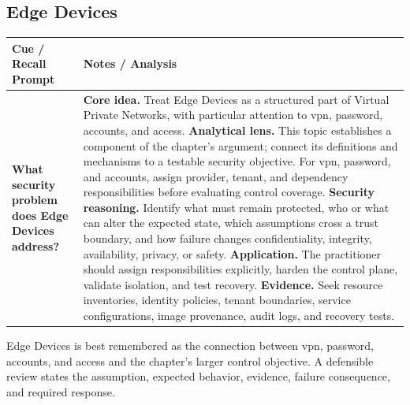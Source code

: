 \documentclass[11pt]{article}
\newcommand{\CornellHeader}{%
\rowcolor{Navy}\color{white}\bfseries Cue / Recall Prompt & \color{white}\bfseries Notes / Analysis\\\hline}
\newcommand{\CornellRow}[2]{%
\cellcolor{CueGray}\RaggedRight\textbf{#1} & \RaggedRight #2\\\hline}
\begin{document}
\subsection*{Edge Devices}
\begin{longtable}{>{\RaggedRight\arraybackslash}p{}|>{\RaggedRight\arraybackslash}p{}}
\CornellHeader
\CornellRow{What security problem does Edge Devices address?}{\textbf{Core idea.} Treat Edge Devices as a structured part of Virtual Private Networks, with particular attention to vpn, password, accounts, and access. \textbf{Analytical lens.} This topic establishes a component of the chapter's argument; connect its definitions and mechanisms to a testable security objective. For vpn, password, and accounts, assign provider, tenant, and dependency responsibilities before evaluating control coverage. \textbf{Security reasoning.} Identify what must remain protected, who or what can alter the expected state, which assumptions cross a trust boundary, and how failure changes confidentiality, integrity, availability, privacy, or safety. \textbf{Application.} The practitioner should assign responsibilities explicitly, harden the control plane, validate isolation, and test recovery. \textbf{Evidence.} Seek resource inventories, identity policies, tenant boundaries, service configurations, image provenance, audit logs, and recovery tests.}
\end{longtable}
\begin{topicsummary}
Edge Devices is best remembered as the connection between vpn, password, accounts, and access and the chapter's larger control objective. A defensible review states the assumption, expected behavior, evidence, failure consequence, and required response.
\end{topicsummary}
\end{document}
